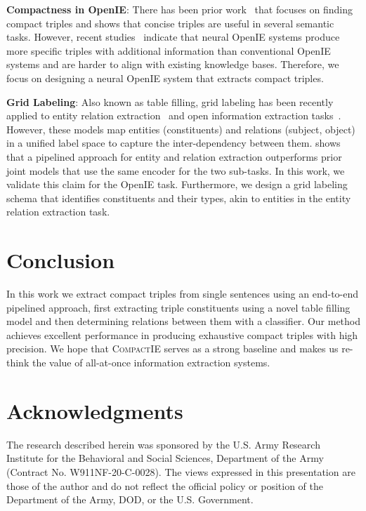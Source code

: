 \documentclass[11pt,a4paper]{article}
\newcommand{\system}{{\textsc{CompactIE}}}
\begin{document}
\noindent
{\bf Compactness in OpenIE}: There has been prior work~\cite{nestie,minie,stanovsky-2016,angeli2015leveraging} that focuses on finding compact triples and shows that concise triples are useful in several semantic tasks. However, recent studies~\cite{lechelle2018wire57,gashteovski2020aligning} indicate that neural OpenIE systems produce more specific triples with additional information than conventional OpenIE systems and are harder to align with existing knowledge bases. Therefore, we focus on designing a neural OpenIE system that extracts compact triples. 

\noindent
{\bf Grid Labeling}: Also known as table filling, grid labeling has been recently applied to entity relation extraction~\cite{gupta2016table,wang2021unire} and open information extraction tasks~\cite{imojie}. However, these models map entities (constituents) and relations (subject, object) in a unified label space to capture the inter-dependency between them. \citep{DBLP:journals/corr/abs-2010-12812} shows that a pipelined approach for entity and relation extraction outperforms prior joint models that use the same encoder for the two sub-tasks. In this work, we validate this claim for the OpenIE task. Furthermore, we design a grid labeling schema that identifies constituents and their types, akin to entities in the entity relation extraction task.

\section{Conclusion}
\label{sec:conc}
In this work we extract compact triples from single sentences using an end-to-end pipelined approach, first extracting triple constituents using a novel table filling model and then determining relations between them with a classifier. Our method achieves excellent performance in producing exhaustive compact triples with high precision. We hope that \system{} serves as a strong baseline and makes us re-think the value of all-at-once information extraction systems.  

\section{Acknowledgments}
\label{sec:ack}
The research described herein was sponsored by the U.S. Army Research Institute for the Behavioral and Social Sciences, Department of the Army (Contract No. W911NF-20-C-0028). The views expressed in this presentation are those of the author and do not reflect the official policy or position of the Department of the Army, DOD, or the U.S. Government.
\end{document}
